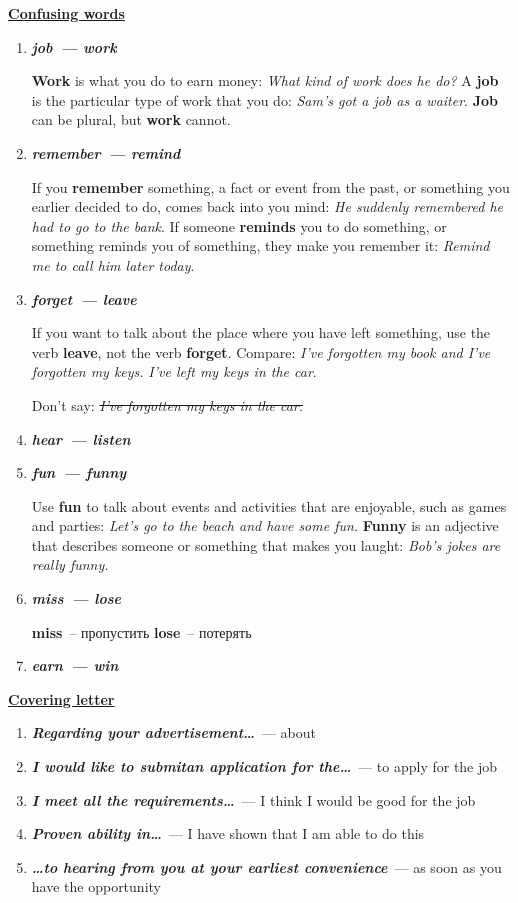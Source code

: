 \documentclass[10pt,a4paper]{article}
\newcommand\ex[1]{\textit{\textbf{{#1}}}}
\begin{document}
\textbf{\underline{Confusing words}}
\begin{enumerate}
  \item \ex{job~--- work}
  
  \textbf{Work} is what you do to earn money: \textit{What kind of work does he do?} A \textbf{job} is the particular type of work that you do: \textit{Sam's got a job as a waiter}. \textbf{Job} can be plural, but \textbf{work} cannot.
  \item \ex{remember~--- remind}
  
  If you \textbf{remember} something, a fact or event from the past, or something you earlier decided to do, comes back into you mind: \textit{He suddenly remembered he had to go to the bank}. If someone \textbf{reminds} you to do something, or something reminds you of something, they make you remember it: \textit{Remind me to call him later today}.
  \item \ex{forget~--- leave}
  
  If you want to talk about the place where you have left something, use the verb \textbf{leave}, not the verb \textbf{forget}. Compare: \textit{I've forgotten my book and I've forgotten my keys.} \textit{I've left my keys in the car}. 
  
  Don't say: \textit{\sout{I've forgotten my keys in the car.}}
  \item \ex{hear~--- listen}
  \item \ex{fun~--- funny}
  
  Use \textbf{fun} to talk about events and activities that are enjoyable, such as games and parties: \textit{Let's go to the beach and have some fun.} \textbf{Funny} is an adjective that describes someone or something that makes you laught: \textit{Bob's jokes are really funny.}
  \item \ex{miss~--- lose}
  
  \textbf{miss}~-- пропустить
  \textbf{lose}~-- потерять
  \item \ex{earn~--- win}
  
\end{enumerate}

\par\medskip\textbf{\underline{Covering letter}}
\begin{enumerate}
  \item \ex{Regarding your advertisement\dots}~--- about
  \item \ex{I would like to submitan application for the\dots}~--- to apply for the job
  \item \ex{I meet all the requirements\dots}~--- I think I would be good for the job
  \item \ex{Proven ability in\dots}~--- I have shown that I am able to do this
  \item \ex{\dots to hearing from you at your earliest convenience}~--- as soon as you have the opportunity
\end{enumerate}
\end{document}
